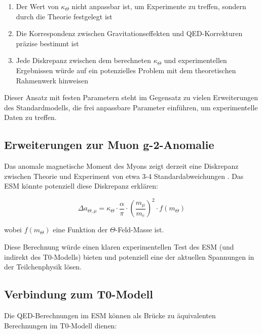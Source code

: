 \documentclass[12pt,a4paper]{article}
\begin{document}
	\begin{enumerate}
		\item Der Wert von $\kappa_{\Theta}$ nicht anpassbar ist, um Experimente zu treffen, sondern durch die Theorie festgelegt ist
		\item Die Korrespondenz zwischen Gravitationseffekten und QED-Korrekturen präzise bestimmt ist
		\item Jede Diskrepanz zwischen dem berechneten $\kappa_{\Theta}$ und experimentellen Ergebnissen würde auf ein potenzielles Problem mit dem theoretischen Rahmenwerk hinweisen
	\end{enumerate}
	
	Dieser Ansatz mit festen Parametern steht im Gegensatz zu vielen Erweiterungen des Standardmodells, die frei anpassbare Parameter einführen, um experimentelle Daten zu treffen.
	
	\subsection{Erweiterungen zur Muon g-2-Anomalie}
	\label{subsec:muon_g2}
	
	Das anomale magnetische Moment des Myons zeigt derzeit eine Diskrepanz zwischen Theorie und Experiment von etwa 3-4 Standardabweichungen \cite{Muong-2:2021ojo}. Das ESM könnte potenziell diese Diskrepanz erklären:
	
	\begin{equation}
		\Delta a_{\Theta,\mu} = \kappa_{\Theta} \cdot \frac{\alpha}{\pi} \cdot \left(\frac{m_{\mu}}{m_e}\right)^2 \cdot f(m_{\Theta})
		\label{eq:muon_correction}
	\end{equation}
	
	wobei $f(m_{\Theta})$ eine Funktion der $\Theta$-Feld-Masse ist.
	
	Diese Berechnung würde einen klaren experimentellen Test des ESM (und indirekt des T0-Modells) bieten und potenziell eine der aktuellen Spannungen in der Teilchenphysik lösen.
	
	\subsection{Verbindung zum T0-Modell}
	\label{subsec:t0_connection}
	
	Die QED-Berechnungen im ESM können als Brücke zu äquivalenten Berechnungen im T0-Modell dienen:
	
\end{document}
